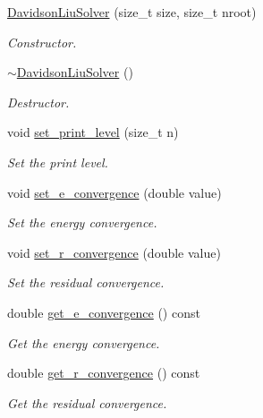 \begin{DoxyCompactItemize}
\item 
\mbox{\hyperlink{classforte_1_1_davidson_liu_solver_a1b843c1999b520d6bd65e68db087a78d}{Davidson\+Liu\+Solver}} (size\+\_\+t size, size\+\_\+t nroot)
\begin{DoxyCompactList}\small\item\em Constructor. \end{DoxyCompactList}\item 
\mbox{\hyperlink{classforte_1_1_davidson_liu_solver_ac8e1ff5995ed726339cb5500de75fb3e}{$\sim$\+Davidson\+Liu\+Solver}} ()
\begin{DoxyCompactList}\small\item\em Destructor. \end{DoxyCompactList}\item 
void \mbox{\hyperlink{classforte_1_1_davidson_liu_solver_a833b7e36f2e1b45e0e1ebe656a2eb826}{set\+\_\+print\+\_\+level}} (size\+\_\+t n)
\begin{DoxyCompactList}\small\item\em Set the print level. \end{DoxyCompactList}\item 
void \mbox{\hyperlink{classforte_1_1_davidson_liu_solver_a24cacf196136a1003e1867bf5de0ff7b}{set\+\_\+e\+\_\+convergence}} (double value)
\begin{DoxyCompactList}\small\item\em Set the energy convergence. \end{DoxyCompactList}\item 
void \mbox{\hyperlink{classforte_1_1_davidson_liu_solver_aecc764a37729a8ecf814f44bac9fb60e}{set\+\_\+r\+\_\+convergence}} (double value)
\begin{DoxyCompactList}\small\item\em Set the residual convergence. \end{DoxyCompactList}\item 
double \mbox{\hyperlink{classforte_1_1_davidson_liu_solver_a7575f9ba87e5acf32af334f88fa5acf3}{get\+\_\+e\+\_\+convergence}} () const
\begin{DoxyCompactList}\small\item\em Get the energy convergence. \end{DoxyCompactList}\item 
double \mbox{\hyperlink{classforte_1_1_davidson_liu_solver_a0dc38a4a9e09c92568d97049c9cd193a}{get\+\_\+r\+\_\+convergence}} () const
\begin{DoxyCompactList}\small\item\em Get the residual convergence. \end{DoxyCompactList}\item 

\end{DoxyCompactItemize}

